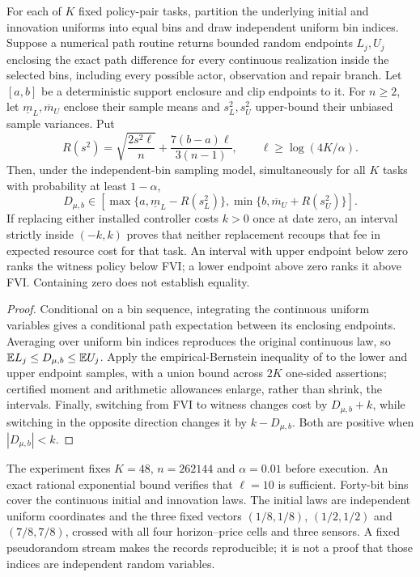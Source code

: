 \begin{theorem}\label{thm:decision48}
For each of $K$ fixed policy-pair tasks, partition the underlying initial and innovation uniforms into equal bins and draw independent uniform bin indices. Suppose a numerical path routine returns bounded random endpoints $L_j,U_j$ enclosing the exact path difference for every continuous realization inside the selected bins, including every possible actor, observation and repair branch. Let $[a,b]$ be a deterministic support enclosure and clip endpoints to it. For $n\ge2$, let $\underline m_L,\overline m_U$ enclose their sample means and $s_L^2,s_U^2$ upper-bound their unbiased sample variances. Put
\begin{equation}\label{eq:bern48}
 R(s^2)=\sqrt{\frac{2s^2\ell}{n}}
       +\frac{7(b-a)\ell}{3(n-1)},\qquad
 \ell\ge\log(4K/\alpha).
\end{equation}
Then, under the independent-bin sampling model, simultaneously for all $K$ tasks with probability at least $1-\alpha$,
\begin{equation}\label{eq:confidence48}
 D_{\mu,b}\in
 [\max\{a,\underline m_L-R(s_L^2)\},
   \min\{b,\overline m_U+R(s_U^2)\}].
\end{equation}
If replacing either installed controller costs $k>0$ once at date zero, an interval strictly inside $(-k,k)$ proves that neither replacement recoups that fee in expected resource cost for that task. An interval with upper endpoint below zero ranks the witness policy below FVI; a lower endpoint above zero ranks it above FVI. Containing zero does not establish equality.
\end{theorem}
\begin{proof}
Conditional on a bin sequence, integrating the continuous uniform variables gives a conditional path expectation between its enclosing endpoints. Averaging over uniform bin indices reproduces the original continuous law, so $\mathbb E L_j\le D_{\mu,b}\le\mathbb E U_j$. Apply the empirical-Bernstein inequality of \citet{maurer2009} to the lower and upper endpoint samples, with a union bound across $2K$ one-sided assertions; certified moment and arithmetic allowances enlarge, rather than shrink, the intervals. Finally, switching from FVI to witness changes cost by $D_{\mu,b}+k$, while switching in the opposite direction changes it by $k-D_{\mu,b}$. Both are positive when $|D_{\mu,b}|<k$.
\end{proof}

The experiment fixes $K=48$, $n=262144$ and $\alpha=0.01$ before execution. An exact rational exponential bound verifies that $\ell=10$ is sufficient. Forty-bit bins cover the continuous initial and innovation laws. The initial laws are independent uniform coordinates and the three fixed vectors $(1/8,1/8)$, $(1/2,1/2)$ and $(7/8,7/8)$, crossed with all four horizon--price cells and three sensors. A fixed pseudorandom stream makes the records reproducible; it is not a proof that those indices are independent random variables.

